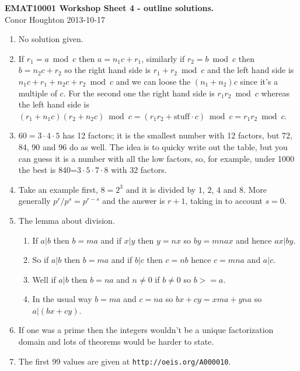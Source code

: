 \documentclass[12pt]{article}
\begin{document}
\begin{center}
{\bf EMAT10001 Workshop Sheet 4 - outline solutions.}\\[1cm]{} Conor Houghton 2013-10-17
\end{center}

\begin{enumerate}

\item No solution given.

\item If $r_1=a\bmod{c}$ then $a=n_1c+r_1$, similarly if
  $r_2=b\bmod{c}$ then $b=n_2c+r_2$ so the right hand side is
  $r_1+r_2\bmod{c}$ and the left hand side is
  $n_1c+r_1+n_2c+r_2\bmod{c}$ and we can loose the $(n_1+n_2)c$ since
  it's a multiple of $c$. For the second one the right hand side is
  $r_1r_2\bmod{c}$ whereas the left hand side is
  $(r_1+n_1c)(r_2+n_2c)\bmod{c}=(r_1r_2+\mbox{stuff}\cdot
  c)\bmod{c}=r_1r_2\bmod{c}$.

\item $60=3\cdot 4\cdot 5$ has 12 factors; it is the smallest number with 12 factors, but 72, 84, 90 and 96 do as well. The idea is to quicky write out the table, but you can guess it is a number with all the low factors, so, for example, under 1000 the best is 840=$3\cdot 5\cdot 7\cdot 8$ with 32 factors.

\item Take an example first, $8=2^3$ and it is divided by $1$, $2$,
  $4$ and $8$. More generally $p^r/p^s=p^{r-s}$ and the answer is
  $r+1$, taking in to account $s=0$.

\item The lemma about division.
\begin{enumerate}
\item If $a|b$ then $b=ma$ and if $x|y$ then $y=nx$ so $by=mnax$ and
  hence $ax|by$.
\item So if $a|b$ then $b=ma$ and if $b|c$ then $c=nb$ hence $c=mna$
  and $a|c$.
\item Well if $a|b$ then $b=na$ and $n\not=0$ if $b\not=0$ so $b>=a$.
\item In the usual way $b=ma$ and $c=na$ so $bx+cy=xma+yna$ so $a|(bx+cy)$.
\end{enumerate}

\item If one was a prime then the integers wouldn't be a unique factorization domain and lots of theorems would be harder to state.

\item The first 99 values are given at \texttt{http://oeis.org/A000010}.


\end{enumerate}
\end{document}
